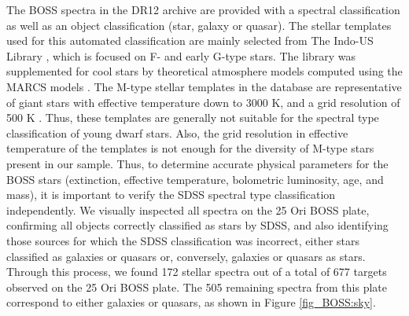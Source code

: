 \documentclass[12pt]{article}
\begin{document}
The BOSS spectra in the DR12 archive are provided with a spectral classification as well as an object classification (star, galaxy or quasar). The stellar templates used for this automated classification are mainly selected from The Indo-US Library \citep{Valdes2004}, which is focused on F- and early G-type stars. The library was supplemented for cool stars by theoretical atmosphere models computed using the MARCS models \citep{Gustafsson2008}. The M-type stellar templates in the database are representative of giant stars with effective temperature down to 3000 K, and a grid resolution of 500 K \citep{Palacios2010}. Thus, these templates are generally not suitable for the spectral type classification of young dwarf stars. Also, the grid resolution in effective temperature of the templates is not enough for the diversity of M-type stars present in our sample. Thus, to determine accurate physical parameters for the BOSS stars (extinction, effective temperature, bolometric luminosity, age, and mass), it is important to verify the SDSS spectral type classification independently. We visually inspected all spectra on the 25 Ori BOSS plate, confirming all objects correctly classified as stars by SDSS, and also identifying those sources for which the SDSS classification was incorrect, either stars classified as galaxies or quasars or, conversely, galaxies or quasars as stars. Through this process, we found 172 stellar spectra out of a total of 677 targets observed on the 25 Ori BOSS plate. The 505 remaining spectra from this plate correspond to either galaxies or quasars, as shown in Figure \ref{fig_BOSS:sky}.
\end{document}
